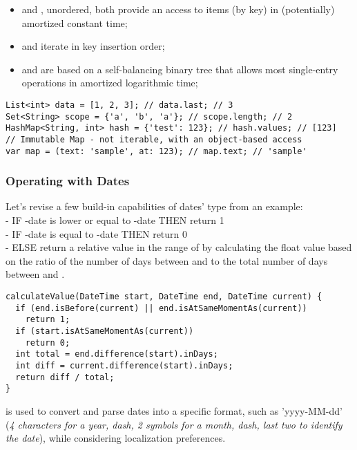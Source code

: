 \begin{itemize}
  \item {} and , unordered, both provide an access to items (by key) in (potentially) amortized 
  constant time;
  \item {} and  iterate in key insertion order;
  \item {} and  are based on a self-balancing binary tree that allows most single-entry 
  operations in amortized logarithmic time;
\end{itemize}

\begin{lstlisting}
List<int> data = [1, 2, 3]; // data.last; // 3
Set<String> scope = {'a', 'b', 'a'}; // scope.length; // 2
HashMap<String, int> hash = {'test': 123}; // hash.values; // [123]
// Immutable Map - not iterable, with an object-based access
var map = (text: 'sample', at: 123); // map.text; // 'sample'
\end{lstlisting}


\subsubsection{Operating with Dates}

Let's revise a few build-in capabilities of dates' type from an example:\\
- IF -date is lower or equal to -date THEN return 1\\
- IF -date is equal to -date THEN return 0\\
- ELSE return a relative value in the range of  by calculating the float value based on the ratio of the number 
of days between  and  to the total number of days between  and .

\begin{lstlisting}
calculateValue(DateTime start, DateTime end, DateTime current) {
  if (end.isBefore(current) || end.isAtSameMomentAs(current))
    return 1;
  if (start.isAtSameMomentAs(current))
    return 0;  
  int total = end.difference(start).inDays;
  int diff = current.difference(start).inDays;
  return diff / total;
}
\end{lstlisting}

\noindent {} is used to convert and parse dates into a specific format, such as 'yyyy-MM-dd' 
(\emph{4 characters for a year, dash, 2 symbols for a month, dash, last two to identify the date}), while considering 
localization preferences.

